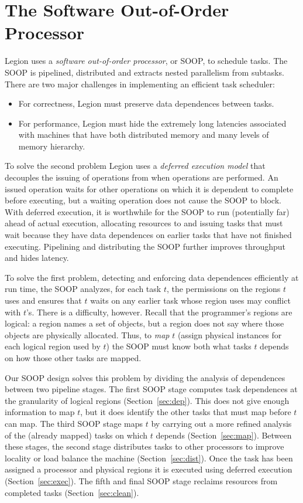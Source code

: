 \section{The Software Out-of-Order Processor}
\label{sec:soop}

Legion uses a {\em  software out-of-order processor}, or SOOP, to schedule tasks.  The SOOP 
is pipelined, distributed and extracts nested parallelism from subtasks.
There are two major challenges in implementing an efficient task scheduler:
\begin{itemize}
\item  For correctness, Legion must preserve data dependences between tasks.

\item For performance, Legion must hide the extremely long latencies associated
  with machines that have both distributed memory and many levels of
  memory hierarchy.
\end{itemize}

To solve the second problem Legion uses a {\em deferred execution model} that decouples the issuing
of operations from when operations are performed.  An issued operation waits for other operations on
which it is dependent to complete before executing, but a waiting operation does not cause the SOOP
to block.  With deferred execution, it is worthwhile for the SOOP to run (potentially far) ahead of actual execution,
allocating resources to and issuing tasks that must wait because they have data dependences on earlier tasks that have not 
finished executing.   Pipelining and distributing the SOOP further improves throughput and hides latency.

To solve the first problem, detecting and enforcing data dependences
efficiently at run time, the SOOP analyzes, for each task $t$, the
permissions on the regions $t$ uses and ensures that $t$ waits on any
earlier task whose region uses may conflict with $t$'s.  There is a
difficulty, however.  Recall that the programmer's regions are
logical: a region names a set of objects, but a region does not say
where those objects are physically allocated.
Thus, to {\em map} $t$ (assign physical instances for each logical region used by $t$) the SOOP must know
both what tasks $t$ depends on how those other tasks are mapped.

Our SOOP design solves this problem by dividing the analysis of
dependences between two pipeline stages.  The first SOOP stage
computes task dependences at the granularity of logical regions (Section~\ref{sec:dep}).  This
does not give enough information to map $t$, but it does identify the
other tasks that must map before $t$ can map. 
The third SOOP stage
maps $t$ by carrying out a more refined analysis of the (already
mapped) tasks on which $t$ depends (Section~\ref{sec:map}).
Between these stages, the second stage distributes tasks to other processors
to improve locality or load balance the machine (Section~\ref{sec:dist}).
Once the task has been assigned a processor and physical regions it is executed
using deferred execution (Section~\ref{sec:exec}).  The fifth and final SOOP stage
reclaims resources from completed tasks (Section~\ref{sec:clean}).

